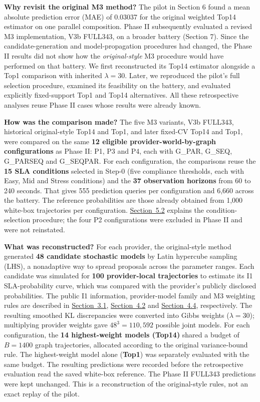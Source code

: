 \documentclass[10pt,a4paper]{article}
\begin{document}
\textbf{Why revisit the original M3 method?} The pilot in Section 6 found a mean absolute prediction error (MAE) of 0.03037 for the original weighted Top14 estimator on one parallel composition. Phase II subsequently evaluated a revised M3 implementation, V3b FULL343, on a broader battery (Section 7). Since the candidate-generation and model-propagation procedures had changed, the Phase II results did not show how the \emph{original-style} M3 procedure would have performed on that battery. We first reconstructed its Top14 estimator alongside a Top1 comparison with inherited $\lambda=30$. Later, we reproduced the pilot's full selection procedure, examined its feasibility on the battery, and evaluated explicitly fixed-support Top1 and Top14 alternatives. All these retrospective analyses reuse Phase II cases whose results were already known.

\textbf{How was the comparison made?} The five M3 variants, V3b FULL343, historical original-style Top14 and Top1, and later fixed-CV Top14 and Top1, were compared on the same \textbf{12 eligible provider-world-by-graph configurations} as Phase II: P1, P3 and P4, each with G\_PAR, G\_SEQ, G\_PARSEQ and G\_SEQPAR. For each configuration, the comparisons reuse the \textbf{15 SLA conditions} selected in Step-0 (five compliance thresholds, each with Easy, Mid and Stress conditions) and the \textbf{37 observation horizons} from 60 to 240 seconds. That gives 555 prediction queries per configuration and 6,660 across the battery. The reference probabilities are those already obtained from 1,000 white-box trajectories per configuration. \hyperref[sec:experimental-design]{Section~5.2} explains the condition-selection procedure; the four P2 configurations were excluded in Phase II and were not reinstated.

\textbf{What was reconstructed?} For each provider, the original-style method generated \textbf{48 candidate stochastic models} by Latin hypercube sampling (LHS), a nonadaptive way to spread proposals across the parameter ranges. Each candidate was simulated for \textbf{100 provider-local trajectories} to estimate its I1 SLA-probability curve, which was compared with the provider's publicly disclosed probabilities. The public I1 information, provider-model family and M3 weighting rules are described in \hyperref[sec:public-interface-i1]{Section~3.1}, \hyperref[sec:provider-model-family]{Section~4.2} and \hyperref[sec:m3-method]{Section~4.4}, respectively. The resulting smoothed KL discrepancies were converted into Gibbs weights ($\lambda=30$); multiplying provider weights gave $48^3=110{,}592$ possible joint models. For each configuration, the \textbf{14 highest-weight models (Top14)} shared a budget of $B=1400$ graph trajectories, allocated according to the original variance-bound rule. The highest-weight model alone (\textbf{Top1}) was separately evaluated with the same budget. The resulting predictions were recorded before the retrospective evaluation read the saved white-box reference. The Phase II FULL343 predictions were kept unchanged. This is a reconstruction of the original-style rules, not an exact replay of the pilot.
\end{document}
